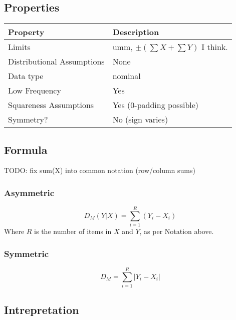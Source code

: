 \documentclass[11pt]{article}
\begin{document}
\subsection{Properties}
\begin{tabular}{| l || l |}
    \hline
    {\bf Property} & {\bf Description} \\
    \hline
    Limits & umm, $\pm (\sum{X} + \sum{Y}) $ I think. \\ \hline

    Distributional Assumptions& None \\ \hline

    Data type & nominal \\ \hline

    Low Frequency & Yes \\ \hline

    Squareness Assumptions & Yes (0-padding possible) \\ \hline
    
    Symmetry? & No (sign varies) \\ \hline

\end{tabular}


\subsection{Formula}
{\color{red} TODO: fix sum(X) into common notation (row/column sums)}
\subsubsection{Asymmetric}
$$
D_M(Y|X) = \sum_{i=1}^{R}{ (Y_i - X_i) }
$$
Where $R$ is the number of items in $X$ and $Y$, as per Notation above.

\subsubsection{Symmetric}
$$
D_M = \sum_{i=1}^{R}{ |Y_i - X_i| }
$$

\subsection{Intrepretation}
\end{document}
